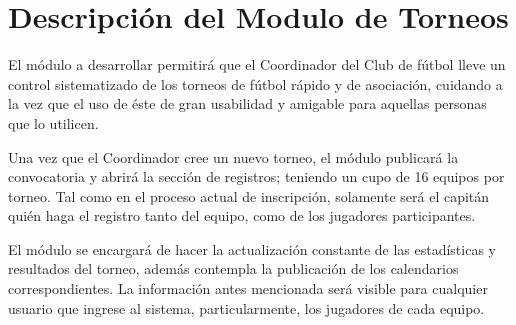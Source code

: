 \section{Descripción del Modulo de Torneos}

\begin{description}

\item El módulo a desarrollar permitirá que el Coordinador del Club de fútbol lleve un control sistematizado de los torneos de fútbol rápido y de asociación, cuidando a la vez que el uso de éste de gran usabilidad y amigable para aquellas personas que lo utilicen.

Una vez que el Coordinador cree un nuevo torneo, el módulo publicará la convocatoria y abrirá la sección de registros; teniendo un cupo de 16 equipos por torneo. Tal como en el proceso actual de inscripción, solamente será el capitán quién haga el registro tanto del equipo, como de los jugadores participantes. 

El módulo se encargará de hacer la actualización constante de las estadísticas y resultados del torneo, además contempla la publicación de los calendarios correspondientes. La información antes mencionada será visible para cualquier usuario que ingrese al sistema, particularmente, los jugadores de cada equipo. 

\end{description}

